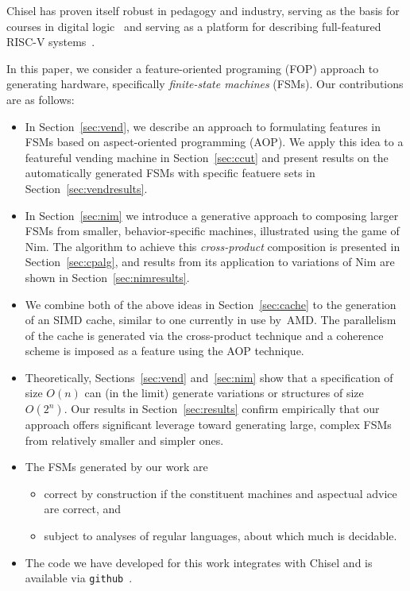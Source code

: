 \documentclass[sigplan,anonymous,review]{acmart}
\begin{document}
Chisel has proven itself robust in pedagogy and industry, serving as the basis for courses in digital logic~\cite{vlsicourse} and serving as a platform for describing full-featured RISC-V systems~\cite{chisel:riscv}.  

In this paper, we consider a feature-oriented programing (FOP) approach to generating hardware, specifically \emph{finite-state machines} (FSMs).   Our contributions are as follows:
\begin{itemize}
    \item In Section~\ref{sec:vend}, we describe an approach to formulating features in FSMs based on aspect-oriented programming (AOP).  We apply this idea to a featureful vending machine in Section~\ref{sec:ccut} and present results on the automatically generated FSMs with specific featuere sets in Section~\ref{sec:vendresults}.
    \item In Section~\ref{sec:nim} we introduce a generative approach to composing larger FSMs from smaller, behavior-specific machines, illustrated using the game of Nim.  The algorithm to achieve this \emph{cross-product} composition is presented in Section~\ref{sec:cpalg}, and results from its application to variations of Nim are shown in Section~\ref{sec:nimresults}.
    \item We combine both of the above ideas in Section~\ref{sec:cache} to the generation of an SIMD cache, similar to one currently in use by~AMD.  The parallelism of the cache is generated via the cross-product technique and a coherence scheme is imposed as a feature using the AOP technique.
    \item Theoretically, Sections~\ref{sec:vend} and~\ref{sec:nim} show that a specification of size $O(n)$ can (in the limit) generate variations or structures of size~$O(2^{n})$.  Our results in Section~\ref{sec:results} confirm empirically that our approach offers significant leverage toward generating large, complex FSMs from relatively smaller and simpler ones. 
    \item The FSMs generated by our work are
    \begin{itemize}
        \item correct by construction if the constituent machines and aspectual advice are correct, and
        \item subject to analyses of regular languages, about which much is decidable. 
    \end{itemize}
    \item The code we have developed for this work integrates with Chisel and is available via \texttt{github}~\cite{anon}.
\end{itemize}
\end{document}
